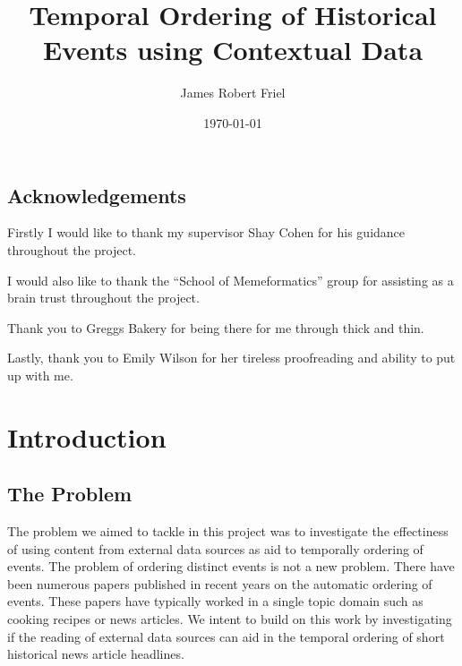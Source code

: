 \documentclass[bsc,frontabs,twoside,singlespacing,parskip,deptreport]{infthesis}     %
\begin{document}
\title{Temporal Ordering of Historical Events using Contextual Data}

\author{James Robert Friel}
 

\date{\today}

\abstract{}


\maketitle

\section*{Acknowledgements}
Firstly I would like to thank my supervisor Shay Cohen for his guidance throughout the project.

I would also like to thank the ``School of Memeformatics'' group for assisting as a brain trust
throughout the project.

Thank you to Greggs Bakery for being there for me through thick and thin.

Lastly, thank you to Emily Wilson for her tireless proofreading and ability to put up with me.

\tableofcontents



\chapter{Introduction}
\section{The Problem}
The problem we aimed to tackle in this project was to investigate the effectiness of using content from
external data sources as aid to temporally ordering of events.
The problem of ordering distinct events is not a new problem. There have been numerous papers published
in recent years on the automatic ordering of events. These papers have typically worked in a single
topic domain such as cooking recipes or news articles. We intent to build on this work by
investigating if the reading of external data sources can aid in the temporal ordering of short
historical news article headlines.
\end{document}
